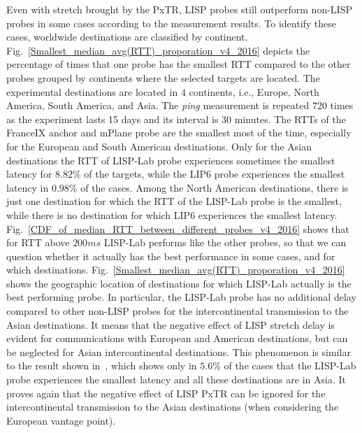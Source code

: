 Even with stretch brought by the PxTR, LISP probes still outperform non-LISP probes in some cases according to the measurement results. To identify these cases, worldwide destinations are classified by continent.
Fig.~\ref{Smallest_median_avg(RTT)_proporation_v4_2016} depicts the percentage of times that one probe has the smallest RTT compared to the other probes grouped by continents where the selected targets are located.
The experimental destinations are located in 4 continents, i.e., Europe, North America, South America, and Asia. The \emph{ping} measurement is repeated 720 times as the experiment lasts 15 days and its interval is 30 minutes. The RTTs of the FranceIX anchor and mPlane probe are the smallest most of the time, especially for the European and South American destinations. Only for the Asian destinations the RTT of LISP-Lab probe experiences sometimes the smallest latency for $8.82\%$ of the targets, while the LIP6 probe experiences the smallest latency in $0.98\%$ of the cases. Among the North American destinations, there is just one destination for which the RTT of the LISP-Lab probe is the smallest, while there is no destination for which LIP6 experiences the smallest latency. Fig.~\ref{CDF_of_median_RTT_between_different_probes_v4_2016} shows that for RTT above $200ms$ LISP-Lab performs like the other probes, so that we can question whether it actually has the best performance in some cases, and for which destinations. Fig.~\ref{Smallest_median_avg(RTT)_proporation_v4_2016} shows the geographic location of destinations for which LISP-Lab actually is the best performing probe. In particular, the LISP-Lab probe has no additional delay compared to other non-LISP probes for the intercontinental transmission to the Asian destinations. It means that the negative effect of LISP stretch delay is evident for communications with European and American destinations, but can be neglected for Asian intercontinental destinations. This phenomenon is similar to the result shown in~\cite{li2016performance}, which shows only in $5.6\%$ of the cases that the LISP-Lab probe experiences the smallest latency and all these destinations are in Asia. It proves again that the negative effect of LISP PxTR can be ignored for the intercontinental transmission to the Asian destinations (when considering the European vantage point).

 \begin{table}[!tb]
 	\centering
 	\caption{Correlation coefficient to FranceIX (IPv4) from Dataset 2016}
 	\label{correlation_v4_2016}{
 	}
 \end{table}

